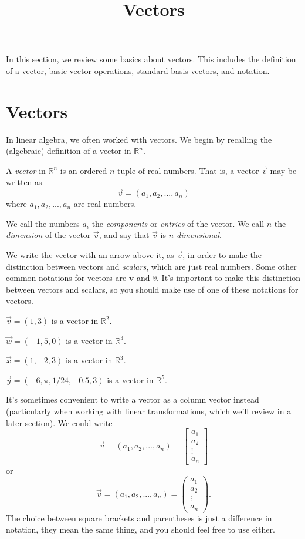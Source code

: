 \documentclass{ximera}
\title{Vectors}
\begin{document}
  
\begin{abstract}  
\end{abstract}  
\maketitle 

In this section, we review some basics about vectors. This includes the definition of a vector, basic vector operations, standard basis vectors, and notation.

\section*{Vectors}

In linear algebra, we often worked with vectors. We begin by recalling the (algebraic) definition of a vector in $\mathbb{R}^n$.

\begin{definition}
A \emph{vector} in $\mathbb{R}^n$ is an ordered $n$-tuple of real numbers. That is, a vector $\vec{v}$ may be written as
\[
\vec{v} = (a_1,a_2,...,a_n)
\]
where $a_1,a_2,...,a_n$ are real numbers.

We call the numbers $a_i$ the \emph{components} or \emph{entries} of the vector. We call $n$ the \emph{dimension} of the vector $\vec{v}$, and say that $\vec{v}$ is \emph{$n$-dimensional}.
\end{definition}

We write the vector with an arrow above it, as $\vec{v}$, in order to make the distinction between vectors and \emph{scalars}, which are just real numbers. Some other common notations for vectors are $\mathbf{v}$ and $\hat{v}$. It's important to make this distinction between vectors and scalars, so you should make use of one of these notations for vectors.

\begin{example}
$\vec{v} = (1,3)$ is a vector in $\mathbb{R}^2$.

$\vec{w} = (-1,5,0)$ is a vector in $\mathbb{R}^3$.

$\vec{x} = (1,-2,3)$ is a vector in $\mathbb{R}^3$.

$\vec{y} = (-6,\pi, 1/24, -0.5, 3)$ is a vector in $\mathbb{R}^5$.
\end{example}

It's sometimes convenient to write a vector as a column vector instead (particularly when working with linear transformations, which we'll review in a later section). We could write
\[
\vec{v} = (a_1,a_2,...,a_n)=\left[\begin{array}{c}a_1\\a_2\\\vdots\\a_n\end{array}\right]
\]
or
\[
\vec{v} = (a_1,a_2,...,a_n)=\left(\begin{array}{c}a_1\\a_2\\\vdots\\a_n\end{array}\right).
\]
The choice between square brackets and parentheses is just a difference in notation, they mean the same thing, and you should feel free to use either.
\end{document}
